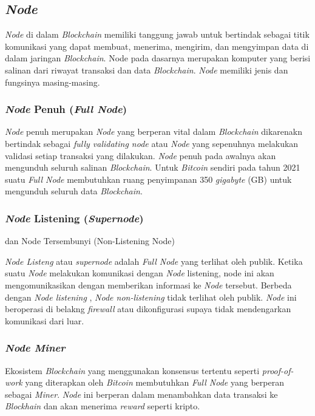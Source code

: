 \subsection{\emph{Node}}

\emph{Node} di dalam \emph{Blockchain} memiliki tanggung jawab untuk bertindak sebagai titik komunikasi yang dapat membuat, menerima, mengirim, dan mengyimpan data di dalam jaringan \emph{Blockchain}. Node pada dasarnya merupakan komputer yang berisi salinan dari riwayat transaksi dan data \emph{Blockchain}. \emph{Node} memiliki jenis dan fungsinya masing-masing. 

\subsubsection{\emph{Node} Penuh (\emph{Full Node})}

\emph{Node} penuh merupakan \emph{Node} yang berperan vital dalam \emph{Blockchain} dikarenakn bertindak sebagai \emph{fully validating node} atau \emph{Node} yang sepenuhnya melakukan validasi setiap transaksi yang dilakukan. \emph{Node} penuh pada awalnya akan mengunduh seluruh salinan \emph{Blockchain}. Untuk \emph{Bitcoin} sendiri pada tahun 2021 suatu \emph{Full Node} membutuhkan ruang penyimpanan 350 \emph{gigabyte} (GB) untuk mengunduh seluruh data \emph{Blockchain}.

\subsubsection{\emph{Node} Listening (\emph{Supernode})} dan Node Tersembunyi (Non-Listening Node)

\emph{Node Listeng} atau \emph{supernode} adalah \emph{Full Node} yang terlihat oleh publik. Ketika suatu \emph{Node} melakukan komunikasi dengan \emph{Node} listening, node ini akan mengomunikasikan dengan memberikan informasi ke \emph{Node} tersebut. Berbeda dengan \emph{Node listening} , \emph{Node non-listening} tidak terlihat oleh publik. \emph{Node} ini beroperasi di belakng \emph{firewall} atau dikonfigurasi supaya tidak mendengarkan komunikasi dari luar.

\subsubsection{\emph{Node Miner}}

Ekosistem \emph{Blockchain} yang menggunakan konsensus tertentu seperti \emph{proof-of-work} yang diterapkan oleh \emph{Bitcoin} membutuhkan \emph{Full Node} yang berperan sebagai \emph{Miner}. \emph{Node} ini berperan dalam menambahkan data transaksi ke \emph{Blockhain} dan akan menerima \emph{reward} seperti kripto.

